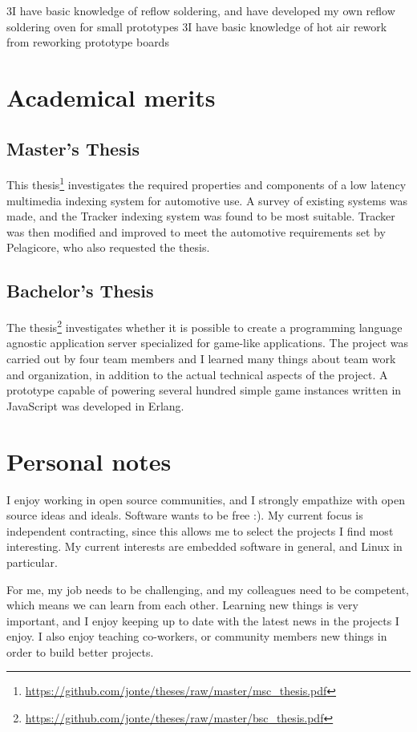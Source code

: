 \documentclass{twocolcv}
\begin{document}
 {
     {3}{I have basic knowledge of reflow soldering, and have developed my own reflow soldering oven for small prototypes}
       {3}{I have basic knowledge of hot air rework from reworking prototype boards}
}

\section*{Academical merits}

  \subsection*{Master's Thesis}
This thesis\footnote{\url{https://github.com/jonte/theses/raw/master/msc_thesis.pdf}} investigates the required properties and components of a low latency multimedia indexing system for automotive use. A survey of existing systems was made, and the Tracker indexing system was found to be most suitable. Tracker was then modified and improved to meet the automotive requirements set by Pelagicore, who also requested the thesis.

\subsection*{Bachelor's Thesis}
The thesis\footnote{\url{https://github.com/jonte/theses/raw/master/bsc_thesis.pdf}} investigates whether it is possible to create a programming language agnostic application server specialized for game-like applications. The project was carried out by four team members and I learned many things about team work and organization, in addition to the actual technical aspects of the project. A prototype capable of powering several hundred simple game instances written in JavaScript was developed in Erlang.

\section*{Personal notes}
I enjoy working in open source communities, and I strongly empathize with open source ideas and ideals. Software wants to be free :). My current focus is independent contracting, since this allows me to select the projects I find most interesting. My current interests are embedded software in general, and Linux in particular.

For me, my job needs to be challenging, and my colleagues need to be competent, which means we can learn from each other. Learning new things is very important, and I enjoy keeping up to date with the latest news in the projects I enjoy. I also enjoy teaching co-workers, or community members new things in order to build better projects.
\end{document}
